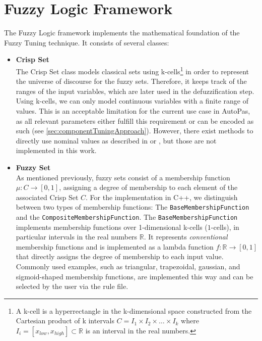 \section{Fuzzy Logic Framework}

The Fuzzy Logic framework implements the mathematical foundation of the Fuzzy Tuning technique. It consists of several classes:

\begin{itemize}
  \item \textbf{Crisp Set}\\
        The Crisp Set class models classical sets using k-cells\footnote{A k-cell is a hyperrectangle in the k-dimensional space constructed from the Cartesian product of k intervals $C = I_1 \times I_2 \times \ldots \times I_k$ where $I_i = [x_{low}, x_{high}] \subset \mathbb{R} $ is an interval in the real numbers.} in order to represent the universe of discourse for the fuzzy sets. Therefore, it keeps track of the ranges of the input variables, which are later used in the defuzzification step.
        Using k-cells, we can only model continuous variables with a finite range of values. This is an acceptable limitation for the current use case in AutoPas, as all relevant parameters either fulfill this requirement or can be encoded as such (see \autoref{sec:componentTuningApproach}). However, there exist methods to directly use nominal values as described in \cite{ReydelCastillo2012} or \cite{Jodoin2006}, but those are not implemented in this work.

  \item \textbf{Fuzzy Set} \\
        As mentioned previously, fuzzy sets consist of a membership function $\mu: C \rightarrow [0, 1]$, assigning a degree of membership to each element of the associated Crisp Set $C$. For the implementation in C++, we distinguish between two types of membership functions: The \texttt{BaseMembershipFunction} and the \texttt{CompositeMembershipFunction}. The \texttt{BaseMembershipFunction} implements membership functions over 1-dimensional k-cells ($1$-cells), in particular intervals in the real numbers $\mathbb{R}$. It represents \emph{conventional} membership functions and is implemented as a lambda function $f: \mathbb{R} \rightarrow [0, 1]$ that directly assigns the degree of membership to each input value. Commonly used examples, such as triangular, trapezoidal, gaussian, and sigmoid-shaped membership functions, are implemented this way and can be selected by the user via the rule file.


\end{itemize}
